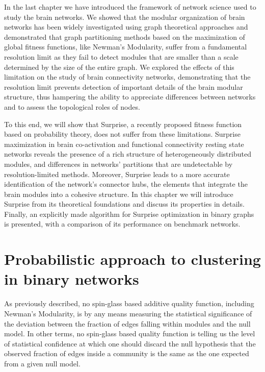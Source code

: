 In the last chapter we have introduced the framework of network science used to study the brain networks. We showed that the modular organization of brain networks has been widely investigated using graph theoretical approaches and demonstrated that graph partitioning methods based on the maximization of global fitness functions, like Newman's Modularity, suffer from a fundamental resolution limit as they fail to detect modules that are smaller than a scale determined by the size of the entire graph.
We explored the effects of this limitation on the study of brain connectivity networks, demonstrating that the resolution limit prevents detection of important details of the brain modular structure, thus hampering the ability to appreciate differences between networks and to assess the topological roles of nodes.

To this end, we will show that Surprise, a recently proposed fitness function based on probability theory, does not suffer from these limitations.
Surprise maximization in brain co-activation and functional connectivity resting state networks reveals the presence of a rich structure of heterogeneously distributed modules, and differences in networks' partitions that are undetectable by resolution-limited methods.
Moreover, Surprise leads to a more accurate identification of the network's connector hubs, the elements that integrate the brain modules into a cohesive structure. 
In this chapter we will introduce Surprise from its theoretical foundations and discuss its properties in details. Finally, an explicitly made algorithm for Surprise optimization in binary graphs is presented, with a comparison of its performance on benchmark networks.

\section{Probabilistic approach to clustering in binary networks}\label{sec:probability_clustering}
As previously described, no spin-glass based additive quality function, including Newman's Modularity, is by any means measuring the statistical significance of the deviation between the fraction of edges falling within modules and the null model.
In other terms, no spin-glass based quality function is telling us the level of statistical confidence at which one should discard the null hypothesis that the observed fraction of edges inside a community is the same as the one expected from a given null model.

